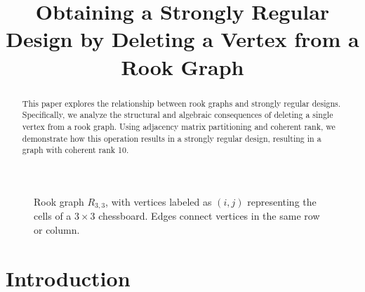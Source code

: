 \documentclass{article}
\title{Obtaining a Strongly Regular Design by Deleting a Vertex from a Rook Graph}
\author{}
\date{}
\begin{document}
\maketitle
\begin{figure}[h!]
\centering
{}
\caption{Rook graph \( R_{3,3} \), with vertices labeled as \( (i, j) \) representing the cells of a \( 3 \times 3 \) chessboard. Edges connect vertices in the same row or column.}
\label{fig:rook-graph}
\end{figure}


\begin{abstract}
This paper explores the relationship between rook graphs and strongly regular designs. Specifically, we analyze the structural and algebraic consequences of deleting a single vertex from a rook graph. Using adjacency matrix partitioning and coherent rank, we demonstrate how this operation results in a strongly regular design, resulting in a graph with coherent rank 10.
\end{abstract}

\newpage
\section{Introduction}
\end{document}
